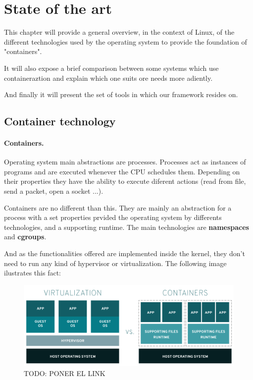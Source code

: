 \clearpage\section{State of the art}
This chapter will provide a general overview, in the context of Linux, of the different technologies used by the operating system to provide the foundation of "containers".

It will also expose a brief comparison between some systems which use containeraztion and explain which one suits ore needs more adiently.

And finally it will present the set of tools in which our framework resides on.

\subsection{Container technology}
\paragraph{Containers.} Operating system main abstractions are processes. Processes act as instances of programs and are executed whenever the CPU schedules them. Depending on their properties they have the ability to execute diferent actions (read from file, send a packet, open a socket ...).

Containers are no different than this. They are mainly an abstraction for a process with a set properties prvided the operating system by differents technologies, and a supporting runtime. The main technologies are \textbf{namespaces} and \textbf{cgroups}.

And as the functionalities offered are implemented inside the kernel, they don't need to run any kind of hypervisor or virtualization. The following image ilustrates this fact:

\begin{figure}[H]
\label{fig:Virtualization vs Containers}
\centering
\includegraphics[width=\textwidth]{img/02/02-state-virtualization-vs-containers.png}
\caption[Virtualization vs Containers]{\footnotesize{TODO: PONER EL LINK}}
\end{figure}

